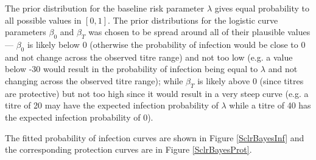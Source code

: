 \documentclass[12pt]{article}
\begin{document}
The prior distribution for the baseline risk parameter $\lambda$ gives equal probability to all possible values in $[0, 1]$. The prior distributions for the logistic curve parameters $\beta_0$ and $\beta_T$ was chosen to be spread around all of their plausible values --- $\beta_0$ is likely below 0 (otherwise the probability of infection would be close to 0 and not change across the observed titre range) and not too low (e.g. a value below -30 would result in the probability of infection being equal to $\lambda$ and not changing across the observed titre range); while $\beta_T$ is likely above 0 (since titres are protective) but not too high since it would result in a very steep curve (e.g. a titre of 20 may have the expected infection probability of $\lambda$ while a titre of 40 has the expected infection probability of 0).

The fitted probability of infection curves are shown in Figure \ref{SclrBayesInf} and the corresponding protection curves are in Figure \ref{SclrBayesProt}.
\end{document}
